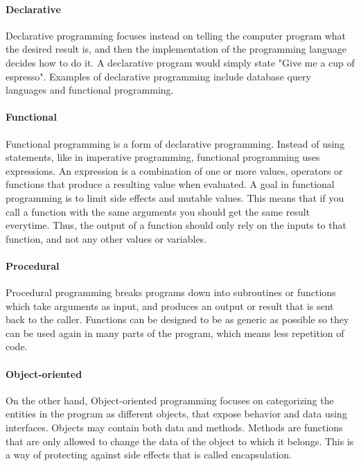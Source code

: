 \documentclass[12pt, a4paper]{article}
\begin{document}
\paragraph{Declarative} Declarative programming focuses instead on telling the computer program what the desired result is, and then the implementation of the programming language decides how to do it. A declarative program would simply state "Give me a cup of espresso". Examples of declarative programming include database query languages and functional programming.

\paragraph{Functional} Functional programming is a form of declarative programming. Instead of using statements, like in imperative programming, functional programming uses expressions. An expression is a combination of one or more values, operators or functions that produce a resulting value when evaluated. A goal in functional programming is to limit side effects and mutable values. This means that if you call a function with the same arguments you should get the same result everytime. Thus, the output of a function should only rely on the inputs to that function, and not any other values or variables.

\newpage
\paragraph{Procedural} Procedural programming breaks programs down into subroutines or functions which take arguments as input, and produces an output or result that is sent back to the caller. Functions can be designed to be as generic as possible so they can be used again in many parts of the program, which means less repetition of code.

\paragraph{Object-oriented} On the other hand, Object-oriented programming focuses on categorizing the entities in the program as different objects, that expose behavior and data using interfaces. Objects may contain both data and methods. Methods are functions that are only allowed to change the data of the object to which it belongs. This is a way of protecting against side effects that is called encapsulation.


\newpage
\end{document}
